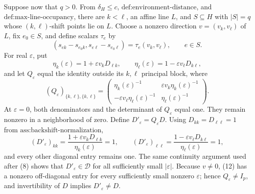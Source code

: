 Suppose now that \(q>0\).  From \(\delta_H\le c\), \(\text{def:environment-distance}\), and \(\text{def:max-line-occupancy}\), there are \(k<\ell\), an affine line \(L\), and \(S\subseteq H\) with \(|S|=q\) whose \((k,\ell)\)-shift points lie on \(L\).  Choose a nonzero direction \(v=(v_k,v_\ell)\) of \(L\), fix \(e_0\in S\), and define scalars \(\tau_e\) by
\[
 (s_{ek}-s_{e_0k},s_{e\ell}-s_{e_0\ell})
 =\tau_e(v_k,v_\ell),\qquad e\in S. \tag{10}
\]
For real \(\varepsilon\), put
\[
 \eta_k(\varepsilon)=1+\varepsilon v_kD_{\ell k},
 \qquad
 \eta_\ell(\varepsilon)=1-\varepsilon v_\ell D_{k\ell}, \tag{11}
\]
and let \(Q_\varepsilon\) equal the identity outside its \(k,\ell\) principal block, where
\[
 (Q_\varepsilon)_{\{k,\ell\},\{k,\ell\}}
 =\begin{pmatrix}
 \eta_k(\varepsilon)^{-1}&\varepsilon v_k\eta_k(\varepsilon)^{-1}\\
 -\varepsilon v_\ell\eta_\ell(\varepsilon)^{-1}&\eta_\ell(\varepsilon)^{-1}
 \end{pmatrix}. \tag{12}
\]
At \(\varepsilon=0\), both denominators and the determinant of \(Q_\varepsilon\) equal one.  They remain nonzero in a neighborhood of zero.  Define \(D'_\varepsilon=Q_\varepsilon D\).  Using \(D_{kk}=D_{\ell\ell}=1\) from \(\text{ass:backshift-normalization}\),
\[
 (D'_\varepsilon)_{kk}
 =\frac{1+\varepsilon v_kD_{\ell k}}{\eta_k(\varepsilon)}=1,
 \qquad
 (D'_\varepsilon)_{\ell\ell}
 =\frac{1-\varepsilon v_\ell D_{k\ell}}{\eta_\ell(\varepsilon)}=1, \tag{13}
\]
and every other diagonal entry remains one.  The same continuity argument used after (8) shows that \(D'_\varepsilon\in\mathcal D\) for all sufficiently small \(|\varepsilon|\).  Because \(v\ne0\), (12) has a nonzero off-diagonal entry for every sufficiently small nonzero \(\varepsilon\); hence \(Q_\varepsilon\ne I_p\), and invertibility of \(D\) implies \(D'_\varepsilon\ne D\).

